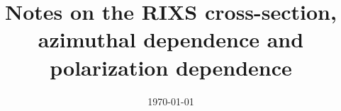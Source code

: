 \documentclass[aps,onecolumn, notitlepage, longbibliography]{revtex4-1}
\begin{document}
\title{Notes on the RIXS cross-section, azimuthal dependence and polarization dependence}




\def\mathbi#1{\ensuremath{\textbf{\em #1}}}
\def\Q{\ensuremath{\mathbi{Q}}}
\def\LNO{LaNiO$_3$}
\newcommand{\angstrom}{\mbox{\normalfont\AA}}
\date{\today}

\newcommand{\ket}[1]{\left|{#1}\right>}
\newcommand{\bra}[1]{\left<{#1}\right|}
\newcommand{\abs}[1]{\left|{#1}\right|}

%
\maketitle
\end{document}
